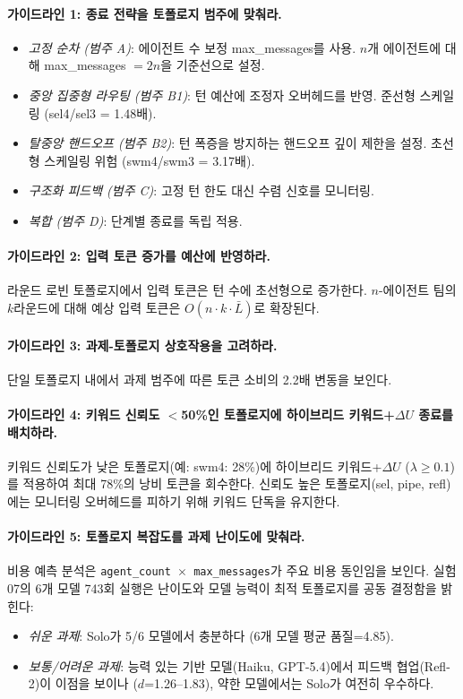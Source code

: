 \documentclass[a4paper,11pt]{article}
\begin{document}
\paragraph{가이드라인 1: 종료 전략을 토폴로지 범주에 맞춰라.}
\begin{itemize}
  \item \emph{고정 순차 (범주 A)}: 에이전트 수 보정 max\_messages를 사용. $n$개 에이전트에 대해 max\_messages $= 2n$을 기준선으로 설정.
  \item \emph{중앙 집중형 라우팅 (범주 B1)}: 턴 예산에 조정자 오버헤드를 반영. 준선형 스케일링 (sel4/sel3 = 1.48배).
  \item \emph{탈중앙 핸드오프 (범주 B2)}: 턴 폭증을 방지하는 핸드오프 깊이 제한을 설정. 초선형 스케일링 위험 (swm4/swm3 = 3.17배).
  \item \emph{구조화 피드백 (범주 C)}: 고정 턴 한도 대신 수렴 신호를 모니터링.
  \item \emph{복합 (범주 D)}: 단계별 종료를 독립 적용.
\end{itemize}

\paragraph{가이드라인 2: 입력 토큰 증가를 예산에 반영하라.}
라운드 로빈 토폴로지에서 입력 토큰은 턴 수에 초선형으로 증가한다. $n$-에이전트 팀의 $k$라운드에 대해 예상 입력 토큰은 $O(n \cdot k \cdot \bar{L})$로 확장된다.

\paragraph{가이드라인 3: 과제-토폴로지 상호작용을 고려하라.}
단일 토폴로지 내에서 과제 범주에 따른 토큰 소비의 2.2배 변동을 보인다.

\paragraph{가이드라인 4: 키워드 신뢰도 $<$50\%인 토폴로지에 하이브리드 키워드+$\Delta U$ 종료를 배치하라.}
키워드 신뢰도가 낮은 토폴로지(예: swm4: 28\%)에 하이브리드 키워드+$\Delta U$ ($\lambda \geq 0.1$)를 적용하여 최대 78\%의 낭비 토큰을 회수한다. 신뢰도 높은 토폴로지(sel, pipe, refl)에는 모니터링 오버헤드를 피하기 위해 키워드 단독을 유지한다.

\paragraph{가이드라인 5: 토폴로지 복잡도를 과제 난이도에 맞춰라.}
비용 예측 분석은 \texttt{agent\_count $\times$ max\_messages}가 주요 비용 동인임을 보인다. 실험 07의 6개 모델 743회 실행은 난이도와 모델 능력이 최적 토폴로지를 공동 결정함을 밝힌다:
\begin{itemize}
  \item \emph{쉬운 과제}: Solo가 5/6 모델에서 충분하다 (6개 모델 평균 품질=4.85).
  \item \emph{보통/어려운 과제}: 능력 있는 기반 모델(Haiku, GPT-5.4)에서 피드백 협업(Refl-2)이 이점을 보이나 ($d$=1.26--1.83), 약한 모델에서는 Solo가 여전히 우수하다.
\end{itemize}
\end{document}
